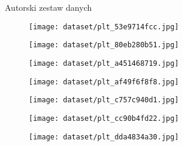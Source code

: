 \begin{easyappendix}{Autorski zestaw danych}
\begin{figure}[H]
    \end{figure}
    \begin{figure}[H]
        \centering
        \texttt{[image: dataset/plt\_53e9714fcc.jpg]}
    \end{figure}
    \begin{figure}[H]
        \centering
        \texttt{[image: dataset/plt\_80eb280b51.jpg]}
    \end{figure}
    \begin{figure}[H]
        \centering
        \texttt{[image: dataset/plt\_a451468719.jpg]}
    \end{figure}
    \begin{figure}[H]
        \centering
        \texttt{[image: dataset/plt\_af49f6f8f8.jpg]}
    \end{figure}
    \begin{figure}[H]
        \centering
        \texttt{[image: dataset/plt\_c757c940d1.jpg]}
    \end{figure}
    \begin{figure}[H]
        \centering
        \texttt{[image: dataset/plt\_cc90b4fd22.jpg]}
    \end{figure}
    \begin{figure}[H]
        \centering
        \texttt{[image: dataset/plt\_dda4834a30.jpg]}
    \end{figure}


\end{easyappendix}
